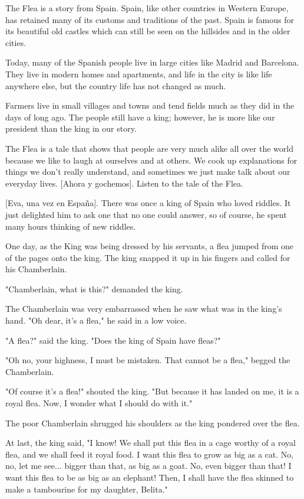 The Flea is a story from Spain. Spain, like other countries in Western Europe, has retained many of its customs and traditions of the past. Spain is famous for its beautiful old castles which can still be seen on the hillsides and in the older cities.

Today, many of the Spanish people live in large cities like Madrid and Barcelona. They live in modern homes and apartments, and life in the city is like life anywhere else, but the country life has not changed as much.

Farmers live in small villages and towns and tend fields much as they did in the days of long ago. The people still have a king; however, he is more like our president than the king in our story.

The Flea is a tale that shows that people are very much alike all over the world because we like to laugh at ourselves and at others. We cook up explanations for things we don't really understand, and sometimes we just make talk about our everyday lives. [Ahora y gochemos]. Listen to the tale of the Flea.

    [Eva, una vez en España]. There was once a king of Spain who loved riddles. It just delighted him to ask one that no one could answer, so of course, he spent many hours thinking of new riddles.

One day, as the King was being dressed by his servants, a flea jumped from one of the pages onto the king. The king snapped it up in his fingers and called for his Chamberlain.

"Chamberlain, what is this?" demanded the king.

The Chamberlain was very embarrassed when he saw what was in the king's hand. "Oh dear, it's a flea," he said in a low voice.

"A flea?" said the king. "Does the king of Spain have fleas?"

"Oh no, your highness, I must be mistaken. That cannot be a flea," begged the Chamberlain.

"Of course it's a flea!" shouted the king. "But because it has landed on me, it is a royal flea. Now, I wonder what I should do with it."

The poor Chamberlain shrugged his shoulders as the king pondered over the flea.

At last, the king said, "I know! We shall put this flea in a cage worthy of a royal flea, and we shall feed it royal food. I want this flea to grow as big as a cat. No, no, let me see... bigger than that, as big as a goat. No, even bigger than that! I want this flea to be as big as an elephant! Then, I shall have the flea skinned to make a tambourine for my daughter, Belita."

